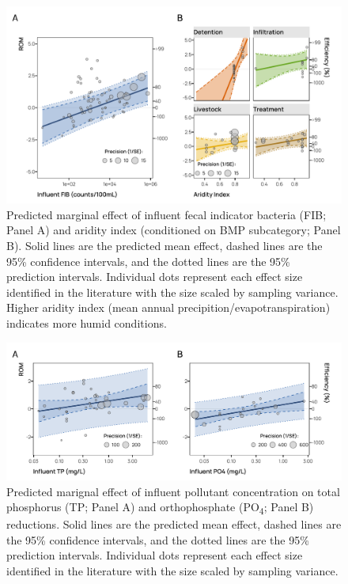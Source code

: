 \documentclass[utf8]{FrontiersinHarvard}
\begin{document}
\begin{figure}[p]
\includegraphics[width=1\linewidth,]{../figures/bac_predicted} \caption{Predicted marginal effect of influent fecal indicator bacteria (FIB; Panel A) and aridity index (conditioned on BMP subcategory; Panel B). Solid lines are the predicted mean effect, dashed lines are the 95\% confidence intervals, and the dotted lines are the 95\% prediction intervals. Individual dots represent each effect size identified in the literature with the size scaled by sampling variance. Higher aridity index (mean annual precipition/evapotranspiration) indicates more humid conditions.}\label{fig:fibeffect}
\end{figure}

\begin{figure}[p]
\includegraphics[width=1\linewidth,]{../figures/phos_predicted} \caption{Predicted marignal effect of influent pollutant concentration on total phosphorus (TP; Panel A) and orthophosphate (PO\textsubscript{4}; Panel B) reductions. Solid lines are the predicted mean effect, dashed lines are the 95\% confidence intervals, and the dotted lines are the 95\% prediction intervals. Individual dots represent each effect size identified in the literature with the size scaled by sampling variance.}\label{fig:phoseffect}
\end{figure}
\end{document}
